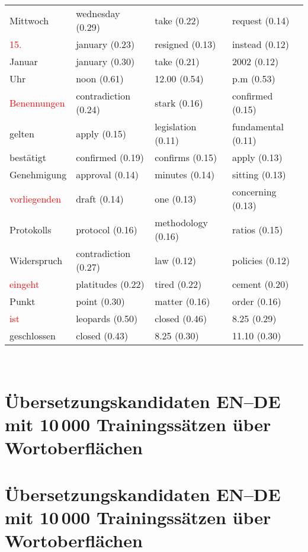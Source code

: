 \documentclass[11pt,twoside,openright]{mpreport}
\begin{document}
\begin{scriptsize}
\begin{tabular}{|llll|}
Mittwoch                & wednesday (0.29) & take (0.22) & request (0.14) \\ %
\textcolor{red}{15.}                     & january (0.23) & resigned (0.13) & instead (0.12) \\
Januar                  & january (0.30) & take (0.21) & 2002 (0.12) \\ %
Uhr                     & noon (0.61) & 12.00 (0.54) & p.m (0.53) \\ %
\textcolor{red}{Benennungen}             & contradiction (0.24) & stark (0.16) & confirmed (0.15) \\
gelten                  & apply (0.15) & legislation (0.11) & fundamental (0.11) \\ %
bestätigt              & confirmed (0.19) & confirms (0.15) & apply (0.13) \\ %
Genehmigung             & approval (0.14) & minutes (0.14) & sitting (0.13) \\ %
\textcolor{red}{vorliegenden}            & draft (0.14) & one (0.13) & concerning (0.13) \\
Protokolls              & protocol (0.16) & methodology (0.16) & ratios (0.15) \\ %
Widerspruch             & contradiction (0.27) & law (0.12) & policies (0.12) \\ %
\textcolor{red}{eingeht}                 & platitudes (0.22) & tired (0.22) & cement (0.20) \\
Punkt                   & point (0.30) & matter (0.16) & order (0.16) \\ %
\textcolor{red}{ist}                     & leopards (0.50) & closed (0.46) & 8.25 (0.29) \\
geschlossen             & closed (0.43) & 8.25 (0.30) & 11.10 (0.30) \\ %
\hline
\end{tabular}\end{scriptsize}\\

\section{Übersetzungskandidaten EN--DE mit 10\,000 Trainingssätzen über Wortoberflächen}
\label{sec:evalDeEn10kSurf}
\section{Übersetzungskandidaten EN--DE mit 10\,000 Trainingssätzen über Wortoberflächen}
\end{document}
